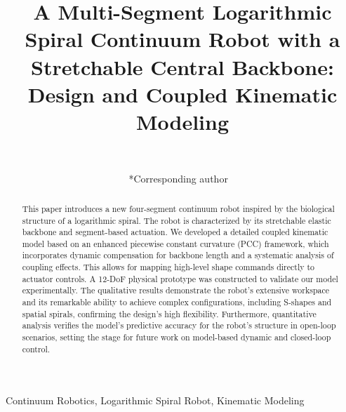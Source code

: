 \documentclass[conference]{IEEEtran}
\begin{document}
\title{A Multi-Segment Logarithmic Spiral Continuum Robot with a Stretchable Central Backbone: Design and Coupled Kinematic Modeling}

\author{
~\\
\and
{}
*Corresponding author
~\\
\and
{}

}

\maketitle

\begin{abstract}
This paper introduces a new four-segment continuum robot inspired by the biological structure of a logarithmic spiral. The robot is characterized by its stretchable elastic backbone and segment-based actuation. We developed a detailed coupled kinematic model based on an enhanced piecewise constant curvature (PCC) framework, which incorporates dynamic compensation for backbone length and a systematic analysis of coupling effects. This allows for mapping high-level shape commands directly to actuator controls. A 12-DoF physical prototype was constructed to validate our model experimentally. The qualitative results demonstrate the robot's extensive workspace and its remarkable ability to achieve complex configurations, including S-shapes and spatial spirals, confirming the design's high flexibility. Furthermore, quantitative analysis verifies the model's predictive accuracy for the robot's structure in open-loop scenarios, setting the stage for future work on model-based dynamic and closed-loop control.
\end{abstract}

\begin{IEEEkeywords}
Continuum Robotics, Logarithmic Spiral Robot, Kinematic Modeling
\end{IEEEkeywords}
\end{document}
